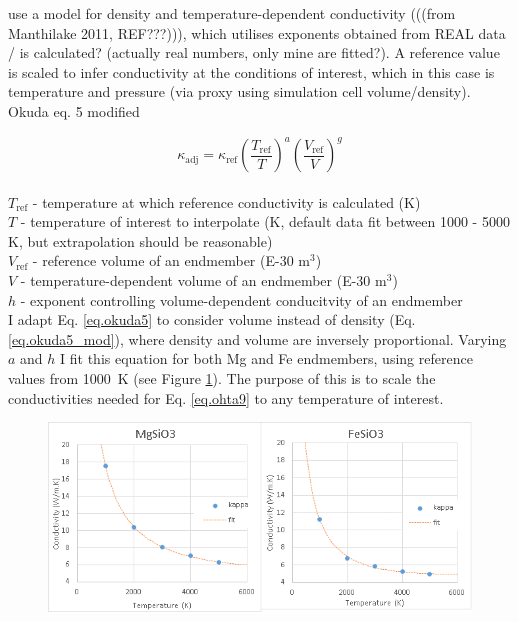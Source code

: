 \citet{Okuda2017} use a model for density and temperature-dependent conductivity (((from Manthilake 2011, REF???))), which utilises exponents obtained from REAL data / is calculated? (actually real numbers, only mine are fitted?). A reference value is scaled to infer conductivity at the conditions of interest, which in this case is temperature and pressure (via proxy using simulation cell volume/density).\\



Okuda eq. 5 modified

\begin{equation}%
\kappa_{\mathrm{adj}}=\kappa_{\mathrm{ref}}\left ( \frac{T_{\mathrm{ref}}}{T} \right )^{a}\left ( \frac{V_{\mathrm{ref}}}{V} \right )^{g}
\label{eq.okuda5_mod}
\end{equation}%
\\ $T_{\mathrm{ref}}$ - temperature at which reference conductivity is calculated (K)\\
$T$ - temperature of interest to interpolate (K, default data fit between 1000 - 5000 K, but extrapolation should be reasonable)\\   
$V_{\mathrm{ref}}$ - reference volume of an endmember (E-30 m$^3$)\\
$V$ - temperature-dependent volume of an endmember (E-30 m$^3$)\\
$h$ - exponent controlling volume-dependent conducitvity of an endmember\\

I adapt Eq. \ref{eq.okuda5} to consider volume instead of density (Eq. \ref{eq.okuda5_mod}), where density and volume are inversely proportional. Varying $a$ and $h$ I fit this equation for both Mg and Fe endmembers, using reference values from 1000~K (see Figure \ref{fig:draft_kt}). The purpose of this is to scale the conductivities needed for Eq. \ref{eq.ohta9} to any temperature of interest.

\begin{figure}[h]
  \includegraphics[width=\linewidth]{Figures/draft_kT.png}
  \caption{}
  \label{fig:draft_kt}
\end{figure}



